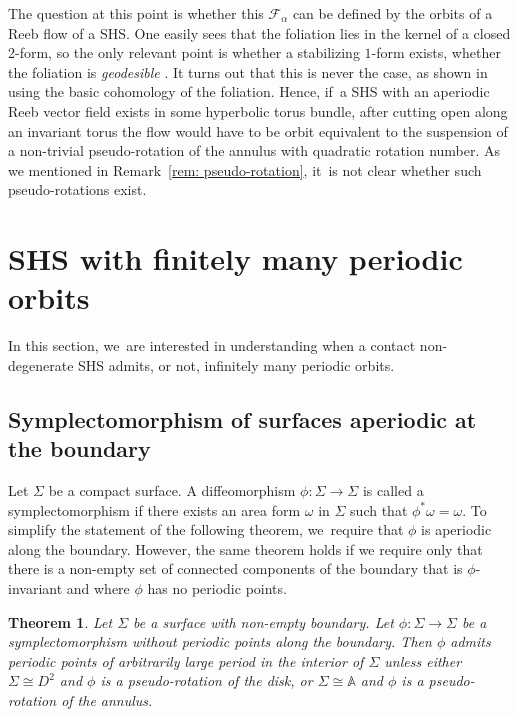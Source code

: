 \documentclass[10pt]{amsart}
\newtheorem{theorem}{Theorem}[section]
\theoremstyle{definition}
\begin{document}
The question at this point is whether this $\mathcal{F}_\alpha$ can be defined by the orbits of a Reeb flow of a SHS. One easily sees that the foliation lies in the kernel of a closed 2-form, so the only relevant point is whether a stabilizing $1$-form exists, \ie whether the foliation is \emph{geodesible} \cite{Sul}. It turns out that this is never the case, as shown in \cite[Rem.\,2.1]{Ac} using the basic cohomology of the foliation. Hence, if~a SHS with an aperiodic Reeb vector field exists in some hyperbolic torus bundle, after cutting open along an invariant torus the flow would have to be orbit equivalent to the suspension of a non-trivial pseudo-rotation of the annulus with quadratic rotation number. As we mentioned in Remark~\ref{rem: pseudo-rotation}, it~is not clear whether such pseudo-rotations exist.

\section{SHS with finitely many periodic orbits}\label{s:finite}

In this section, we~are interested in understanding when a contact non-degenerate SHS admits, or not, infinitely many periodic orbits.

\subsection{Symplectomorphism of surfaces aperiodic at the boundary}

Let $\Sigma$ be a compact surface. A diffeomorphism $\phi:\Sigma \to \Sigma$ is called a symplectomorphism if there exists an area form $\omega$ in $\Sigma$ such that $\phi^*\omega=\omega$. To simplify the statement of the following theorem, we~require that $\phi$ is aperiodic along the boundary. However, the same theorem holds if we require only that there is a non-empty set of connected components of the boundary that is $\phi$-invariant and where $\phi$ has no periodic points.

\begin{theorem} \label{thm:surfirra}
Let $\Sigma$ be a surface with non-empty boundary. Let $\phi:\Sigma \to \Sigma$ be a symplectomorphism without periodic points along the boundary. Then $\phi$ admits periodic points of arbitrarily large period in the interior of $\Sigma$ unless either $\Sigma\cong D^2$ and $\phi$ is a pseudo-rotation of the disk, or $\Sigma \cong \mathbb{A}$ and $\phi$ is a pseudo-rotation of the annulus.
\end{theorem}
\end{document}
